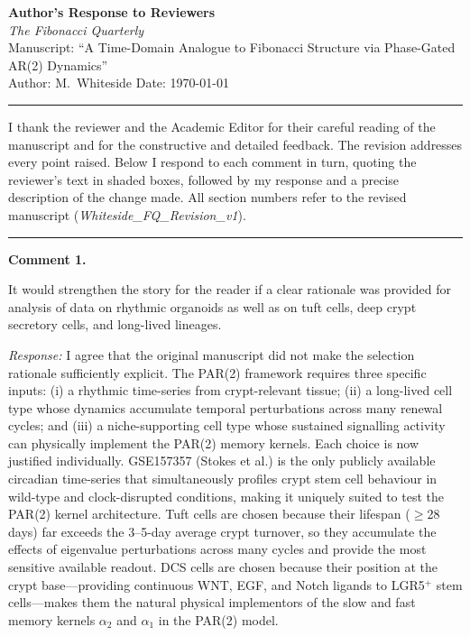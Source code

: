 \documentclass[12pt,a4paper]{article}
\newcommand{\reviewer}[1]{\medskip\noindent{\large\textbf{#1}}\par\smallskip}
\newcommand{\point}[1]{\medskip\noindent\textbf{Comment #1.}\enspace}
\newcommand{\response}{\noindent\textit{Response:}\enspace}
\begin{document}
\begin{center}
  {\Large\textbf{Author's Response to Reviewers}}\\[6pt]
  {\large\textit{The Fibonacci Quarterly}}\\[4pt]
  {\normalsize Manuscript: ``A Time-Domain Analogue to Fibonacci Structure
  via Phase-Gated AR(2) Dynamics''}\\[4pt]
  {\normalsize Author: M.\ Whiteside \quad Date: \today}
\end{center}

\bigskip
\hrule
\bigskip

I thank the reviewer and the Academic Editor for their careful
reading of the manuscript and for the constructive and detailed feedback.
The revision addresses every point raised.
Below I respond to each comment in turn, quoting the reviewer's text
in shaded boxes, followed by my response and a precise description of
the change made.
All section numbers refer to the revised manuscript
(\textit{Whiteside\_FQ\_Revision\_v1}).

\bigskip
\hrule

\reviewer{Reviewer 1}

\point{1}

\begin{reviewbox}
It would strengthen the story for the reader if a clear rationale was
provided for analysis of data on rhythmic organoids as well as on tuft
cells, deep crypt secretory cells, and long-lived lineages.
\end{reviewbox}

\response
I agree that the original manuscript did not make the selection
rationale sufficiently explicit.
The PAR(2) framework requires three specific inputs: (i) a rhythmic
time-series from crypt-relevant tissue; (ii) a long-lived cell type
whose dynamics accumulate temporal perturbations across many renewal
cycles; and (iii) a niche-supporting cell type whose sustained
signalling activity can physically implement the PAR(2) memory kernels.
Each choice is now justified individually.
GSE157357 (Stokes et al.) is the only publicly available circadian
time-series that simultaneously profiles crypt stem cell behaviour in
wild-type and clock-disrupted conditions, making it uniquely suited to
test the PAR(2) kernel architecture.
Tuft cells are chosen because their lifespan ($\geq$28 days) far exceeds
the 3--5-day average crypt turnover, so they accumulate the effects of
eigenvalue perturbations across many cycles and provide the most
sensitive available readout.
DCS cells are chosen because their position at the crypt base---providing
continuous WNT, EGF, and Notch ligands to LGR5$^{+}$ stem cells---makes
them the natural physical implementors of the slow and fast memory
kernels $\alpha_2$ and $\alpha_1$ in the PAR(2) model.
\end{document}
